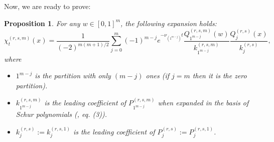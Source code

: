 \documentclass[12pt,reqno]{amsart}
\newtheorem{proposition}{Proposition}
\begin{document}
Now, we are ready to prove:
\begin{proposition}\label{Generalexpansion}
	For any $w \in [0,1]^m$, the following expansion holds:
	\begin{equation*}
		\chi_t^{(r,s,m)}(x) = \frac{1}{(-2)^{m(m+1)/2}}  \sum_{j=0}^m (-1)^{m-j}  e^{-\nu_{(1^{m-j})} t}  \frac{Q_{1^{m-j}}^{(r,s,m)}(w)}{k_{1^{m-j}}^{(r,s,m)}} \frac{Q_{j}^{(r,s)}(x)}{k_{j}^{(r,s)}},
	\end{equation*}
	where \begin{itemize}
	    \item $1^{m-j}$ is the partition with only $(m-j)$ ones (if $j=m$ then it is the zero partition).
        \item $k_{1^{m-j}}^{(r,s,m)}$ is the leading coefficient of $P_{1^{m-j}}^{(r,s,m)}$ when expanded in the basis of Schur polynomials (\cite{MR3075094}, eq. (3)). 
        \item $k_{j}^{(r,s)} := k_{j}^{(r,s,1)}$ is the leading coefficient of $P_j^{(r,s)} := P_{j}^{(r,s,1)}$.
    \end{itemize}
\end{proposition}
\end{document}
